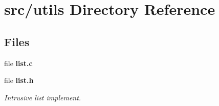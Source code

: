 \section{src/utils Directory Reference}
\label{dir_313caf1132e152dd9b58bea13a4052ca}
\subsection*{Files}
\begin{DoxyCompactItemize}
\item 
file \textbf{ list.\+c}
\item 
file \textbf{ list.\+h}
\begin{DoxyCompactList}\small\item\em Intrusive list implement. \end{DoxyCompactList}\end{DoxyCompactItemize}
